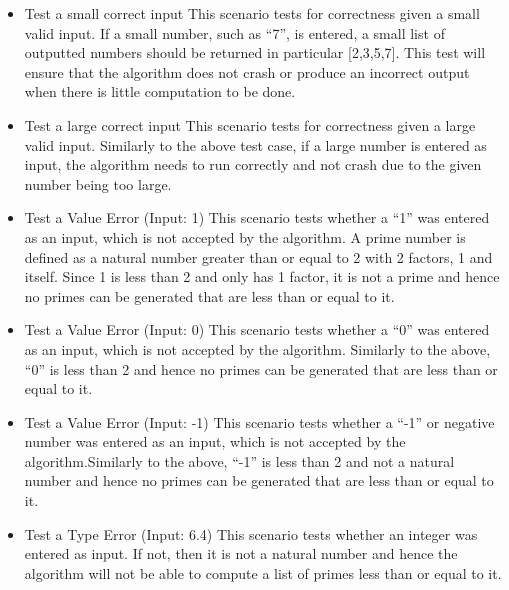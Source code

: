 \documentclass[]{article}
\begin{document}
\begin{itemize}
	\item Test a small correct input\hfill \newline\newline
This scenario tests for correctness given a small valid input. If a small number, such as “7”, is entered, a small list of outputted numbers should be returned in particular [2,3,5,7]. This test will ensure that the algorithm does not crash or produce an incorrect output when there is little computation to be done.
	\item Test a large correct input\hfill \newline\newline
This scenario tests for correctness given a large valid input. Similarly to the above test case, if a large number is entered as input, the algorithm needs to run correctly and not crash due to the given number being too large.
	\item Test a Value Error (Input: 1)\hfill \newline\newline
This scenario tests whether a “1” was entered as an input, which is not accepted by the algorithm. A prime number is defined as a natural number greater than or equal to 2 with 2 factors, 1 and itself. Since 1 is less than 2 and only has 1 factor, it is not a prime and hence no primes can be generated that are less than or equal to it.
	\item Test a Value Error (Input: 0)\hfill \newline\newline
This scenario tests whether a “0” was entered as an input, which is not accepted by the algorithm. Similarly to the above, “0” is less than 2 and hence no primes can be generated that are less than or equal to it.
	\item Test a Value Error (Input: -1)\hfill \newline\newline
This scenario tests whether a “-1” or negative number was entered as an input, which is not accepted by the algorithm.Similarly to the above, “-1” is less than 2 and not a natural number and hence no primes can be generated that are less than or equal to it.
	\item Test a Type Error  (Input: 6.4) \hfill \newline\newline
This scenario tests whether an integer was entered as input. If not, then it is not a natural number and hence the algorithm will not be able to compute a list of primes less than or equal to it.
\end{itemize}
\end{document}
